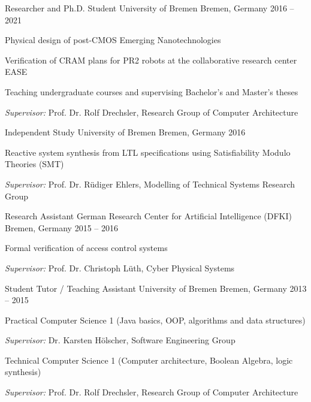\begin{cventries}
  \cventry
    {Researcher and Ph.D. Student} %
    {University of Bremen} %
    {Bremen, Germany} %
    {2016 -- 2021} %
    {
      \begin{cvitems} %
        \item {Physical design of post-CMOS Emerging Nanotechnologies}
        \item {Verification of CRAM plans for PR2 robots at the collaborative research center EASE}
        \item {Teaching undergraduate courses and supervising Bachelor's and Master's theses}
        \item {\emph{Supervisor:} Prof. Dr. Rolf Drechsler, Research Group of Computer Architecture}
      \end{cvitems}
    }

  \cventry
    {Independent Study} %
    {University of Bremen} %
    {Bremen, Germany} %
    {2016} %
    {
      \begin{cvitems} %
        \item {Reactive system synthesis from LTL specifications using Satisfiability Modulo Theories (SMT)}
        \item {\emph{Supervisor:} Prof. Dr. Rüdiger Ehlers, Modelling of Technical Systems Research Group}
      \end{cvitems}
    }

  \cventry
    {Research Assistant} %
    {German Research Center for Artificial Intelligence (DFKI)} %
    {Bremen, Germany} %
    {2015 -- 2016} %
    {
      \begin{cvitems} %
        \item {Formal verification of access control systems}
        \item {\emph{Supervisor:} Prof. Dr. Christoph Lüth, Cyber Physical Systems}
      \end{cvitems}
    }

  \cventry
    {Student Tutor / Teaching Assistant} %
    {University of Bremen} %
    {Bremen, Germany} %
    {2013 -- 2015} %
    {
      \begin{cvitems} %
        \item {Practical Computer Science 1 (Java basics, OOP, algorithms and data structures)}
        \item {\emph{Supervisor:} Dr. Karsten H\"olscher, Software Engineering Group}
        \item {Technical Computer Science 1 (Computer architecture, Boolean Algebra, logic synthesis)}
        \item {\emph{Supervisor:} Prof. Dr. Rolf Drechsler, Research Group of Computer Architecture}
      \end{cvitems}
    }

\end{cventries}
